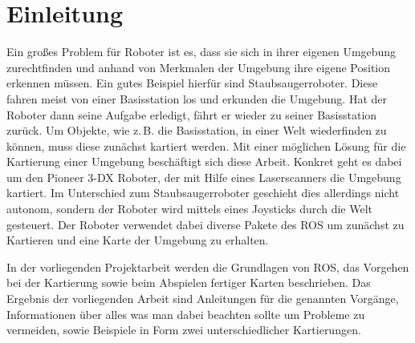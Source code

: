 \chapter{Einleitung} %
\label{cha:einleitung}

Ein großes Problem für Roboter ist es, dass sie sich in ihrer eigenen Umgebung zurechtfinden und anhand von Merkmalen der Umgebung ihre eigene Position erkennen müssen. Ein gutes Beispiel hierfür sind Staubsaugerroboter. Diese fahren meist von einer Basisstation los und erkunden die Umgebung. Hat der Roboter dann seine Aufgabe erledigt, fährt er wieder zu seiner Basisstation zurück. Um Objekte, wie z.\,B. die Basisstation, in einer Welt wiederfinden zu können, muss diese zunächst kartiert werden. Mit einer möglichen Lösung für die Kartierung einer Umgebung beschäftigt sich diese Arbeit. Konkret geht es dabei um den Pioneer 3-DX Roboter, der mit Hilfe eines Laserscanners die Umgebung kartiert. Im Unterschied zum Staubsaugerroboter geschieht dies allerdings nicht autonom, sondern der Roboter wird mittels eines Joysticks durch die Welt gesteuert. Der Roboter verwendet dabei diverse Pakete des \acl{ROS} um zunächst zu Kartieren und eine Karte der Umgebung zu erhalten.\par
In der vorliegenden Projektarbeit werden die Grundlagen von \ac{ROS}, das Vorgehen bei der Kartierung sowie beim Abspielen fertiger Karten beschrieben. Das Ergebnis der vorliegenden Arbeit sind Anleitungen für die genannten Vorgänge, Informationen über alles was man dabei beachten sollte um Probleme zu vermeiden, sowie Beispiele in Form zwei unterschiedlicher Kartierungen.

